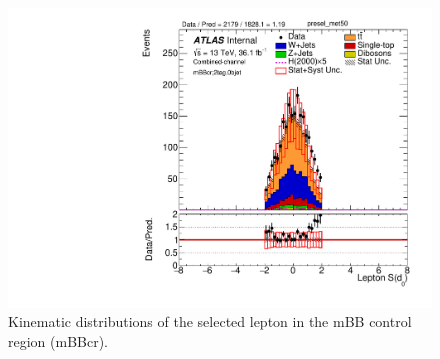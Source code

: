 \begin{figure}[!h]
\begin{center}
\includegraphics[scale=0.33]{./figures/boosted/PlotsInMbbCR/DataMC_2tag_0bjet_mbbcr_lepton_presel_met50_Lep_d0sigL}
\caption{Kinematic distributions of the selected lepton in the mBB control region (mBBcr).}
\label{fig:boosted_mbbcr_lepton}
\end{center}
\end{figure}
 
